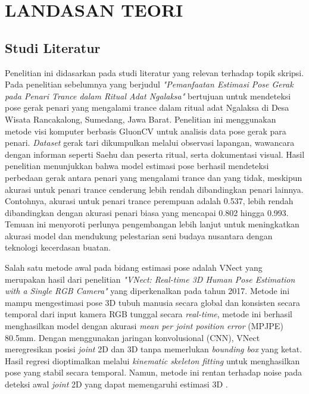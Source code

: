 \chapter{LANDASAN TEORI}
\vspace{1em}

\section{Studi Literatur}
Penelitian ini didasarkan pada studi literatur yang relevan terhadap topik skripsi. Pada penelitian sebelumnya yang berjudul \textit{"Pemanfaatan Estimasi Pose Gerak pada Penari Trance dalam Ritual Adat Ngalaksa"} bertujuan untuk mendeteksi pose gerak penari yang mengalami trance dalam ritual adat Ngalaksa di Desa Wisata Rancakalong, Sumedang, Jawa Barat. Penelitian ini menggunakan metode visi komputer berbasis GluonCV untuk analisis data pose gerak para penari. \textit{Dataset} gerak tari dikumpulkan melalui observasi lapangan, wawancara dengan informan seperti Saehu dan peserta ritual, serta dokumentasi visual. Hasil penelitian menunjukkan bahwa model estimasi pose berhasil mendeteksi perbedaan gerak antara penari yang mengalami trance dan yang tidak, meskipun akurasi untuk penari trance cenderung lebih rendah dibandingkan penari lainnya. Contohnya, akurasi untuk penari trance perempuan adalah 0.537, lebih rendah dibandingkan dengan akurasi penari biasa yang mencapai 0.802 hingga 0.993. Temuan ini menyoroti perlunya pengembangan lebih lanjut untuk meningkatkan akurasi model dan mendukung pelestarian seni budaya nusantara dengan teknologi kecerdasan buatan.

Salah satu metode awal pada bidang estimasi pose adalah VNect yang merupakan hasil dari penelitian \textit{"VNect: Real-time 3D Human Pose Estimation with a Single RGB Camera"} yang diperkenalkan pada tahun 2017. Metode ini mampu mengestimasi pose 3D tubuh manusia secara global dan konsisten secara temporal dari input kamera RGB tunggal secara \textit{real-time}, metode ini berhasil menghasilkan model dengan akurasi \textit{mean per joint position error} (MPJPE) 80.5mm. Dengan menggunakan jaringan konvolusional (CNN), VNect meregresikan posisi \textit{joint} 2D dan 3D tanpa memerlukan \textit{bounding box} yang ketat. Hasil regresi dioptimalkan melalui \textit{kinematic skeleton fitting} untuk menghasilkan pose yang stabil secara temporal. Namun, metode ini rentan terhadap noise pada deteksi awal \textit{joint} 2D yang dapat memengaruhi estimasi 3D \cite{mehta2017vnect}.

